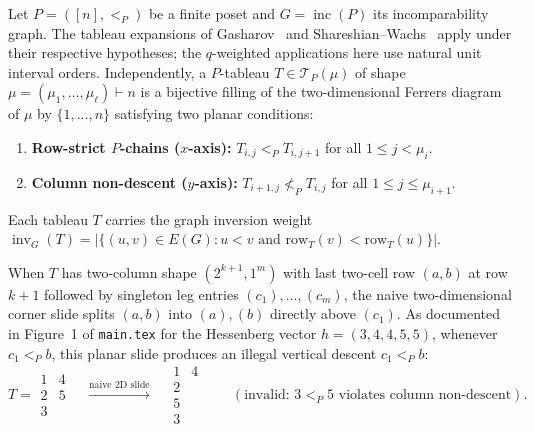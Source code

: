 \documentclass[11pt]{article}
\theoremstyle{definition}
\newcommand{\invG}{\operatorname{inv}_G}
\newcommand{\inc}{\operatorname{inc}}
\newcommand{\TP}{\mathcal{T}_P}
\begin{document}
Let $P = ([n], <_P)$ be a finite poset and $G = \inc(P)$ its incomparability graph. The tableau expansions of Gasharov~\cite{Gas96} and Shareshian--Wachs~\cite{SW16} apply under their respective hypotheses; the $q$-weighted applications here use natural unit interval orders. Independently, a $P$-tableau $T \in \TP(\mu)$ of shape $\mu = (\mu_1, \dots, \mu_\ell) \vdash n$ is a bijective filling of the two-dimensional Ferrers diagram of $\mu$ by $\{1, \dots, n\}$ satisfying two planar conditions:
\begin{enumerate}
  \item \textbf{Row-strict $P$-chains ($x$-axis):} $T_{i,j} <_P T_{i,j+1}$ for all $1 \le j < \mu_i$.
  \item \textbf{Column non-descent ($y$-axis):} $T_{i+1,j} \not<_P T_{i,j}$ for all $1 \le j \le \mu_{i+1}$.
\end{enumerate}
Each tableau $T$ carries the graph inversion weight $\invG(T) = |\{(u, v) \in E(G) : u < v \text{ and } \mathrm{row}_T(v) < \mathrm{row}_T(u)\}|$.

When $T$ has two-column shape $(2^{k+1}, 1^m)$ with last two-cell row $(a, b)$ at row $k+1$ followed by singleton leg entries $(c_1), \dots, (c_m)$, the naive two-dimensional corner slide splits $(a, b)$ into $(a), (b)$ directly above $(c_1)$. As documented in Figure~1 of \texttt{main.tex} for the Hessenberg vector $h = (3,4,4,5,5)$, whenever $c_1 <_P b$, this planar slide produces an illegal vertical descent $c_1 <_P b$:
\[
  T = \begin{array}{cc} 1 & 4 \\ 2 & 5 \\ 3 & \end{array}
  \quad\xrightarrow{\text{naive 2D slide}}\quad
  \begin{array}{cc} 1 & 4 \\ 2 & \\ 5 & \\ 3 & \end{array}
  \qquad (\text{invalid: } 3 <_P 5 \text{ violates column non-descent}).
\]
\end{document}
